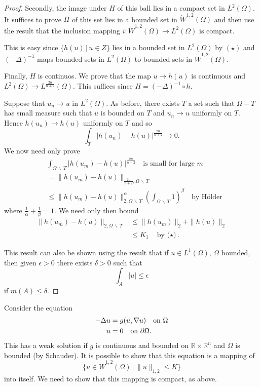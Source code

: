 \documentclass[10pt, oneside, reqno]{amsart}
\theoremstyle{plain}%
\numberwithin{equation}{section}
\theoremstyle{definition}
\theoremstyle{remark}
\newcommand{\given}{ \, | \,}
\newcommand{\R}{\mathbb{R}}
\begin{document}
\begin{proof}
	Secondly, the image under $H$ of this ball lies in a compact set in $L^2(\Omega)$.  It suffices to prove $H$ of this set lies in a bounded set in $\dot W^{1,2}(\Omega)$ and then use the result that the inclusion mapping $i : \dot W^{1, 2}(\Omega) \rightarrow L^2(\Omega)$ is compact.
	
	This is easy since $\{ h(u) \given u \in Z \}$ lies in a bounded set in $L^2(\Omega)$ by $(\star)$ and $(-\Delta)^{-1}$ maps bounded sets in $L^2(\Omega)$ to bounded sets in $\dot W^{1, 2}(\Omega)$.  
	
	Finally, $H$ is continuos. We prove that the map $u \rightarrow h(u)$ is continuous and $L^2(\Omega) \rightarrow L^{\frac{2n}{n+2}}(\Omega)$.  This suffices since $H = (-\Delta)^{-1} \circ h$.  
	
	Suppose that $u_n \rightarrow u$ in $L^2(\Omega)$.  As before, there exists $T$ a set such that $\Omega - T$ has small measure such that $u$ is bounded on $T$ and $u_n \rightarrow u$ uniformly on $T$.  Hence $h(u_n) \rightarrow h(u)$ uniformly on $T$ and so \[
		\int_T \left| h(u_n) - h(u) \right|^{\frac{2n}{n+2}} \rightarrow 0.
	\]  We now need only prove \begin{align*}
		&\int_{\Omega \, \backslash \, T} \left| h(u_m) - h(u) \right|^{\frac{2n}{n+2}} \quad \text{is small for large $m$} \\
		&= \| h(u_m) - h(u) \|_{\frac{2n}{n+2}, \Omega \, \backslash \, T} \\
		&\leq \| h(u_m) - h(u) \|_{2, \Omega \, \backslash \, T}^\alpha \left( \int_{\Omega \, \backslash \, T} 1 \right)^\beta \quad \text{by H\"older}
	\end{align*} where $\frac{1}{\alpha} + \frac{1}{\beta} = 1$.  We need only then bound \begin{align*}
		\| h(u_m) - h(u) \|_{2, \Omega \, \backslash \, T} &\leq \| h(u_m)\|_2  + \| h(u) \|_2 \\
		&\leq K_1 \quad \text{by ($\star$)}.
		\end{align*}
		
		This result can also be shown using the result that if $u \in L^1(\Omega)$, $\Omega$ bounded, then given $\epsilon > 0$ there exists $\delta > 0$ such that \[
			\int_A | u | \leq \epsilon
		\] if $m(A) \leq \delta$.
\end{proof}

Consider the equation \begin{align*}
	-\Delta u &= g(u, \nabla u) \quad \text{on $\Omega$} \\
		u &= 0 \quad \text{on $\partial \Omega$.}
\end{align*}  This has a weak solution if $g$ is continuous and bounded on $\R \times \R^n$ and $\Omega$ is bounded (by Schauder).  It is possible to show that this equation is a mapping of \[
	\{ u \in \dot W^{1, 2}(\Omega) \given \| u \|_{1, 2} \leq K \}
\] into itself.  We need to show that this mapping is compact, as above. 
\end{document}
